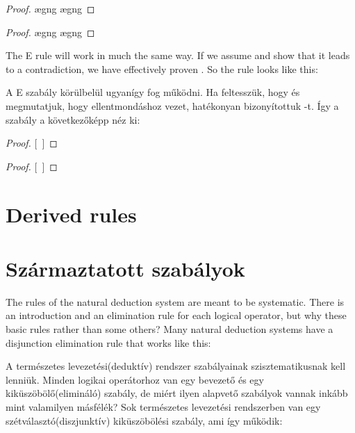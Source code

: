 \begin{proof}
	\open
		\ae{gng}
		\ae{gng}
	\close
\end{proof}

\begin{proof}
	\open
		\ae{gng}
		\ae{gng}
	\close
\end{proof}

The {\enot}E rule will work in much the same way. If we assume \enot{} and show that it leads to a contradiction, we have effectively proven . So the rule looks like this:

A {\enot}E szabály körülbelül ugyanígy fog működni. Ha feltesszük, hogy \enot{} és megmutatjuk, hogy ellentmondáshoz vezet, hatékonyan bizonyítottuk -t. Így a szabály a következőképp néz ki:

\begin{proof}
\open
\close
{}[\ ]{}
\end{proof}

\begin{proof}
\open
\close
{}[\ ]{}
\end{proof}

\section*{Derived rules}
\section{Származtatott szabályok}
The rules of the natural deduction system are meant to be systematic. There is an introduction and an elimination rule for each logical operator, but why these basic rules rather than some others? Many natural deduction systems have a disjunction elimination rule that works like this:

A természetes levezetési(deduktív) rendszer szabályainak szisztematikusnak kell lenniük. Minden logikai operátorhoz van egy bevezető és egy kiküszöbölő(elimináló) szabály, de miért ilyen alapvető szabályok vannak inkább mint valamilyen másfélék? Sok természetes levezetési rendszerben van egy szétválasztó(diszjunktív) kiküszöbölési szabály, ami így működik:

